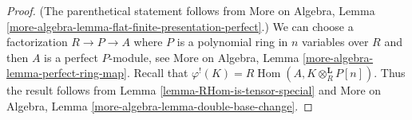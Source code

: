 \documentclass[10pt,a4paper]{amsart}
\theoremstyle{plain}
\theoremstyle{definition}
\theoremstyle{remark}
\numberwithin{equation}{subsection}
\def\Hom{\mathop{\mathrm{Hom}}\nolimits}
\begin{document}
\begin{proof}
(The parenthetical statement follows from
More on Algebra, Lemma
\ref{more-algebra-lemma-flat-finite-presentation-perfect}.)
We can choose a factorization $R \to P \to A$ where $P$ is a polynomial
ring in $n$ variables over $R$ and then $A$ is a perfect $P$-module, see
More on Algebra, Lemma \ref{more-algebra-lemma-perfect-ring-map}.
Recall that $\varphi^!(K) = R\Hom(A, K \otimes_R^\mathbf{L} P[n])$.
Thus the result follows from
Lemma \ref{lemma-RHom-is-tensor-special}
and More on Algebra, Lemma \ref{more-algebra-lemma-double-base-change}.
\end{proof}
\end{document}
